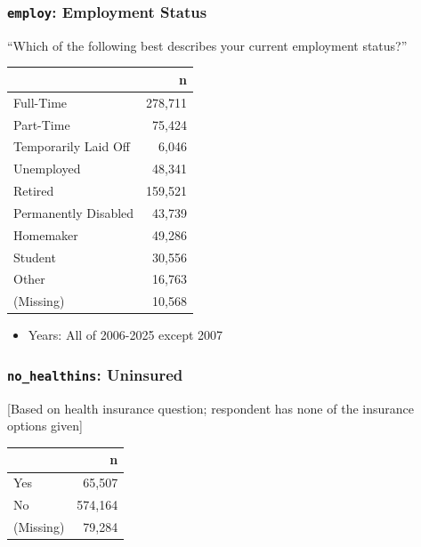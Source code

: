 \documentclass[10pt,article,oneside]{memoir}
\begin{document}
\subsubsection{\texorpdfstring{\texttt{employ}: Employment
Status}{employ: Employment Status}}\label{employ-employment-status}

``Which of the following best describes your current employment
status?''

\begin{table}[H]
\centering
\begin{tabular}[t]{lr}
\toprule
 & n\\
\midrule
Full-Time & 278,711\\
Part-Time & 75,424\\
Temporarily Laid Off & 6,046\\
Unemployed & 48,341\\
Retired & 159,521\\
Permanently Disabled & 43,739\\
Homemaker & 49,286\\
Student & 30,556\\
Other & 16,763\\
(Missing) & 10,568\\
\bottomrule
\end{tabular}
\end{table}

\begin{itemize}
\tightlist
\item
  Years: All of 2006-2025 except 2007
\end{itemize}

\subsubsection{\texorpdfstring{\texttt{no\_healthins}:
Uninsured}{no\_healthins: Uninsured}}\label{no_healthins-uninsured}

{[}Based on health insurance question; respondent has none of the
insurance options given{]}

\begin{table}[H]
\centering
\begin{tabular}[t]{lr}
\toprule
 & n\\
\midrule
Yes & 65,507\\
No & 574,164\\
(Missing) & 79,284\\
\bottomrule
\end{tabular}
\end{table}
\end{document}
